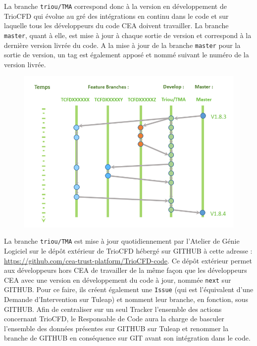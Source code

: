 La branche \texttt{triou/TMA} correspond donc à la version en développement de TrioCFD qui évolue au gré des intégrations en continu dans le code et sur laquelle tous les développeurs du code CEA doivent travailler. La branche \texttt{master}, quant à elle, est mise à jour à chaque sortie de version et correspond à la dernière version livrée du code. A la mise à jour de la branche \texttt{master} pour la sortie de version, un tag est également apposé et nommé suivant le numéro de la version livrée.\\
\begin{figure}[H]
   \centering
   \includegraphics[width=16cm]{pictures/workflow_GIT2.png}
   \vspace*{0.2cm}
\end{figure}
\vspace{0.2cm}
La branche \texttt{triou/TMA} est mise à jour quotidiennement par l'Atelier de Génie Logiciel sur le dépôt extérieur de TrioCFD hébergé sur GITHUB à cette adresse : \url{https://github.com/cea-trust-platform/TrioCFD-code}. Ce dépôt extérieur permet aux développeurs hors CEA de travailler de la même façon que les développeurs CEA avec une version en développement du code à jour, nommée \texttt{next} sur GITHUB. Pour ce faire, ils créent également une \texttt{Issue} (qui est l'équivalent d'une Demande d'Intervention sur Tuleap) et nomment leur branche, en fonction, sous GITHUB. Afin de centraliser sur un seul Tracker l'ensemble des actions concernant TrioCFD, le Responsable de Code aura la charge de basculer l'ensemble des données présentes sur GITHUB sur Tuleap et renommer la branche de GITHUB en conséquence sur GIT avant son intégration dans le code.
